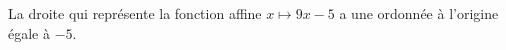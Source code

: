 La droite qui représente la fonction affine $x\mapsto 9x-5$ a une ordonnée à l'origine égale à $-5$.

\begin{reponses}
\end{reponses}

\begin{comment}

\end{comment}

